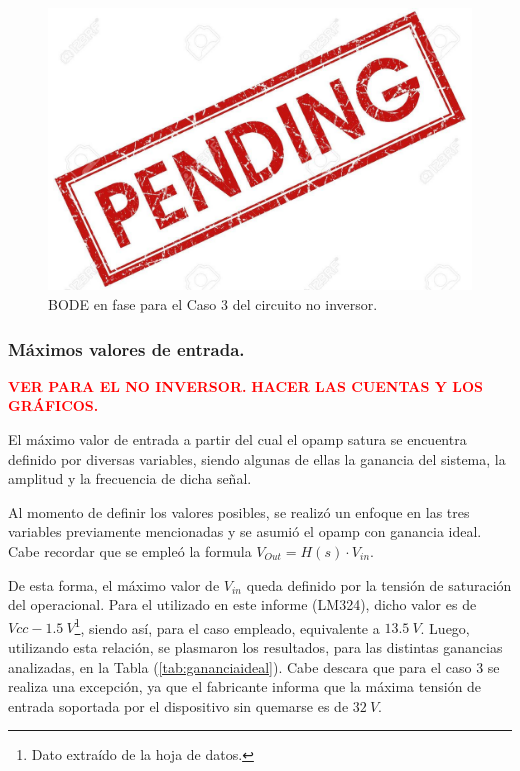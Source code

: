 \begin{figure}[H]	
	\centering
	\includegraphics[width=\textwidth]{ImagenesAux/pend.jpg}
	\caption{BODE en fase para el Caso 3 del circuito no inversor.}
	\label{fig:CompZinphC3}
\end{figure}

\subsubsection{Máximos valores de entrada.}

\begin{center}
\textcolor{red}{\textbf{VER PARA EL NO INVERSOR.}}
\textcolor{red}{\textbf{HACER LAS CUENTAS Y LOS GRÁFICOS.}}
\end{center}

El máximo valor de entrada a partir del cual el opamp satura se encuentra definido por diversas variables, siendo algunas de ellas la ganancia del sistema, la amplitud y la frecuencia de dicha señal.

Al momento de definir los valores posibles, se realizó un enfoque en las tres variables previamente mencionadas y se asumió el opamp con ganancia ideal. Cabe recordar que se empleó la formula $ V_{Out}=H(s)\cdot V_{in} $.

De esta forma, el máximo valor de $V_{in}$ queda definido por la tensión de saturación del operacional. Para el utilizado en este informe (LM324), dicho valor es de $Vcc - 1.5 \ V$\footnote{Dato extraído de la hoja de datos.}, siendo así, para el caso empleado, equivalente a $13.5 \ V$. Luego, utilizando esta relación, se plasmaron los resultados, para las distintas ganancias analizadas, en la Tabla (\ref{tab:gananciaideal}). Cabe descara que para el caso 3 se realiza una excepción, ya que el fabricante informa que la máxima tensión de entrada soportada por el dispositivo sin quemarse es de $32 \ V$.

